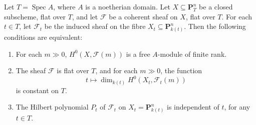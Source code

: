 Let $T = \operatorname{Spec} A$, where $A$ is a noetherian domain. Let $X \subseteq \mathbf{P}_T^n$ be a closed subscheme, flat over $T$, and let $\mathcal{F}$ be a coherent sheaf on $X$, flat over $T$. For each $t \in T$, let $\mathcal{F}_t$ be the induced sheaf on the fibre $X_t \subseteq \mathbf{P}_{k(t)}^n$. Then the following conditions are equivalent:

\begin{enumerate}
  \item[(i)] For each $m \gg 0$, $H^0(X, \mathcal{F}(m))$ is a free $A$-module of finite rank.
  \item[(ii)] The sheaf $\mathcal{F}$ is flat over $T$, and for each $m \gg 0$, the function
  $$t \mapsto \dim_{k(t)} H^0(X_t, \mathcal{F}_t(m))$$
  is constant on $T$.
  \item[(iii)] The Hilbert polynomial $P_t$ of $\mathcal{F}_t$ on $X_t = \mathbf{P}_{k(t)}^n$ is independent of $t$, for any $t \in T$.
\end{enumerate}
